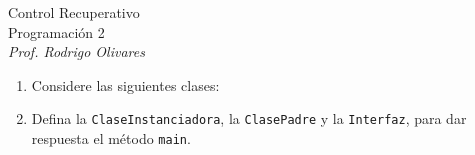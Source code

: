 \documentclass[10pt]{article}
\begin{document}
\begin{center}
	{\Large Control Recuperativo}\\
	Programaci\'on 2 \\
	\emph{\small Prof. Rodrigo Olivares} \\
\end{center}

\begin{enumerate}
    \item[ ] Considere las siguientes clases:
    \begin{center}
        
    \end{center}    
    \begin{center}
        
    \end{center}    
    \item[] Defina la \texttt{ClaseInstanciadora}, la \texttt{ClasePadre} y la \texttt{Interfaz}, para dar respuesta el m\'etodo \texttt{main}.
\end{enumerate}
\end{document}
